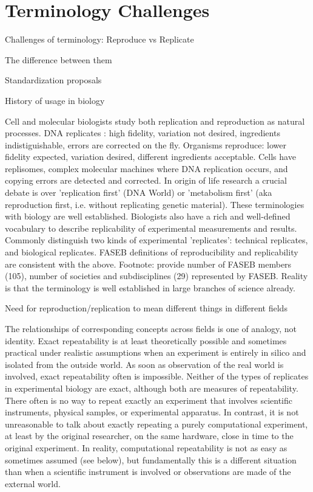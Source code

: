 \section{Terminology Challenges}

	Challenges of terminology: Reproduce vs Replicate

		The difference between them

		Standardization proposals

		History of usage in biology

			Cell and molecular biologists study both replication and reproduction as natural processes.
			DNA replicates :  high fidelity, variation not desired, ingredients indistiguishable, errors are corrected on the fly.
			Organisms reproduce:  lower fidelity expected, variation desired, different ingredients acceptable.
			Cells have replisomes, complex molecular machines where DNA replication occurs, and copying errors are detected and corrected.
			In origin of life research a crucial debate is over 'replication first' (DNA World) or
 					'metabolism first' (aka reproduction first, i.e. without replicating genetic material).
			These terminologies with biology are well established.
			Biologists also have a rich and well-defined vocabulary to describe replicability of experimental measurements and results.
			Commonly distinguish two kinds of experimental 'replicates':  technical replicates, and biological replicates.
			FASEB definitions of reproducibility and replicability are consistent with the above.
			Footnote: provide number of FASEB members (105), number of societies and subdisciplines (29) represented by FASEB.
 			Reality is that the terminology is well established in large branches of science already.

		Need for reproduction/replication to mean different things in different fields

			The relationships of corresponding concepts across fields is one of analogy, not identity.
			Exact repeatability is at least theoretically possible and sometimes practical under realistic assumptions when an experiment
				is entirely in silico and isolated from the outside world.
			As soon as observation of the real world is involved, exact repeatability often is impossible.
			Neither of the types of replicates in experimental biology are exact, although both are measures of repeatability.
			There often is no way to repeat exactly an experiment that involves scientific instruments, physical samples, or experimental apparatus.
			In contrast, it is not unreasonable to talk about exactly repeating a purely computational experiment, at least by the original researcher,
				on the same hardware, close in time to the original experiment.
			In reality, computational repeatability is not as easy as sometimes assumed (see below), but fundamentally this is
				a different situation than when a scientific instrument is involved or observations are made of the external world.

